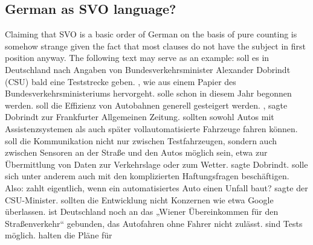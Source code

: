 

\subsection{German as SVO language?}

Claiming that SVO is a basic order of German on the basis of pure counting is somehow strange given the
fact that most  clauses do not have the subject in first position anyway. The following text
may serve as an example:
\eanoraggedright
{} soll es in Deutschland nach Angaben von Bundes\-ver\-kehrs\-mi\-nis\-ter
Alexander Dobrindt (CSU) bald eine Teststrecke geben.  , wie aus einem Papier des
Bundesverkehrsministeriums hervorgeht. 
solle schon in diesem Jahr begonnen werden.  soll die Effizienz von
Autobahnen generell gesteigert werden. , sagte Dobrindt zur Frankfurter
Allgemeinen Zeitung.   sollten sowohl Autos mit Assistenzsystemen als auch
später vollautomatisierte Fahrzeuge fahren können.  soll die Kommunikation nicht nur
zwischen Testfahrzeugen, sondern auch zwi\-schen Sensoren an der Straße und den Autos möglich sein,
etwa zur Übermittlung von Daten zur Verkehrslage oder zum Wetter.  sagte Dobrindt.  solle sich unter anderem auch mit den
komplizierten Haftungsfragen beschäftigen.  Also:  zahlt eigentlich, wenn ein
automatisiertes Auto einen Unfall baut?   sagte der
CSU-Minister.  sollten die Entwicklung nicht Konzernen wie etwa
Google überlassen.   ist Deutschland noch an das „Wiener Über\-ein\-kom\-men für den
Straßenverkehr“ gebunden, das Autofahren ohne Fahrer nicht zulässt.  sind Tests möglich.   halten die Pläne für
